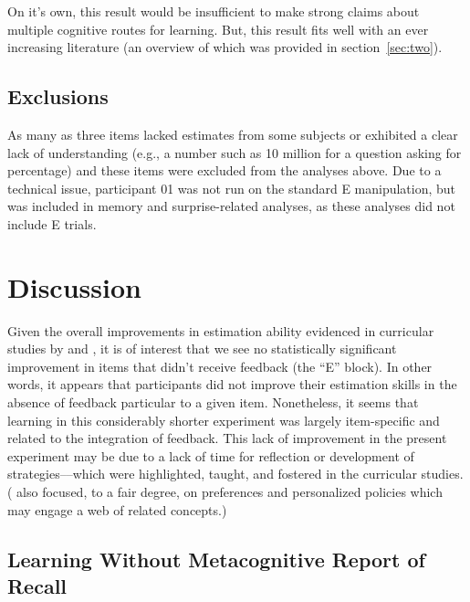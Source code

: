 On it's own, this result would be insufficient to make strong claims about
multiple cognitive routes for learning. But, this result fits well with an ever
increasing literature (an overview of which was provided in
section~\ref{sec:two}).

\subsection{Exclusions}

As many as three items lacked estimates from some subjects or exhibited a clear
lack of understanding (e.g., a number such as 10 million for a question asking
for percentage) and these items were excluded from the analyses above. Due to a
technical issue, participant 01 was not run on the standard E manipulation, but
was included in memory and surprise-related analyses, as these analyses did not
include E trials.

\section{Discussion}

Given the overall improvements in estimation ability evidenced in curricular
studies by \textcite{munnich_numerically-driven_2004} and
\textcite{ranney_designing_2008}, it is of interest that we see no statistically
significant improvement in items that didn't receive feedback (the ``E'' block).
In other words, it appears that participants did not improve their estimation
skills in the absence of feedback particular to a given item.
Nonetheless, it seems that learning in this considerably shorter experiment was
largely item-specific and related to the integration of feedback. This lack of
improvement in the present experiment may be due to a lack of time for
reflection or development of strategies––which were highlighted, taught, and
fostered in the curricular studies.
(\cite{munnich_numerically-driven_2004,ranney_designing_2008} also focused, to
a fair degree, on preferences and personalized policies which may engage a web
of related concepts.)

\subsection{Learning Without Metacognitive Report of Recall}

